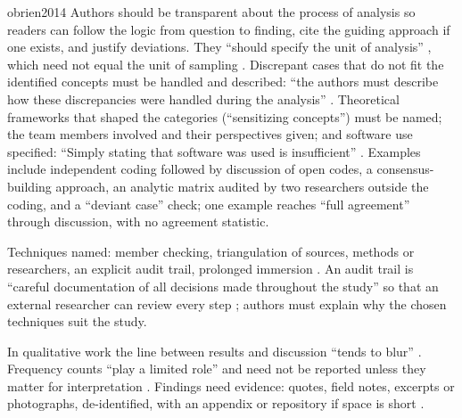\begin{papercard}{obrien2014}
 Authors should be transparent about the process of analysis so readers can follow the logic from question to finding, cite the guiding approach if one exists, and justify deviations. They ``should specify the unit of analysis'' , which need not equal the unit of sampling . Discrepant cases that do not fit the identified concepts must be handled and described: ``the authors must describe how these discrepancies were handled during the analysis'' . Theoretical frameworks that shaped the categories (``sensitizing concepts'') must be named; the team members involved and their perspectives given; and software use specified: ``Simply stating that software was used is insufficient'' . Examples include independent coding followed by discussion of open codes, a consensus-building approach, an analytic matrix audited by two researchers outside the coding, and a ``deviant case'' check; one example reaches ``full agreement'' through discussion, with no agreement statistic.

 Techniques named: member checking, triangulation of sources, methods or researchers, an explicit audit trail, prolonged immersion . An audit trail is ``careful documentation of all decisions made throughout the study'' so that an external researcher can review every step ; authors must explain why the chosen techniques suit the study.

 In qualitative work the line between results and discussion ``tends to blur'' . Frequency counts ``play a limited role'' and need not be reported unless they matter for interpretation . Findings need evidence: quotes, field notes, excerpts or photographs, de-identified, with an appendix or repository if space is short .


\end{papercard}
